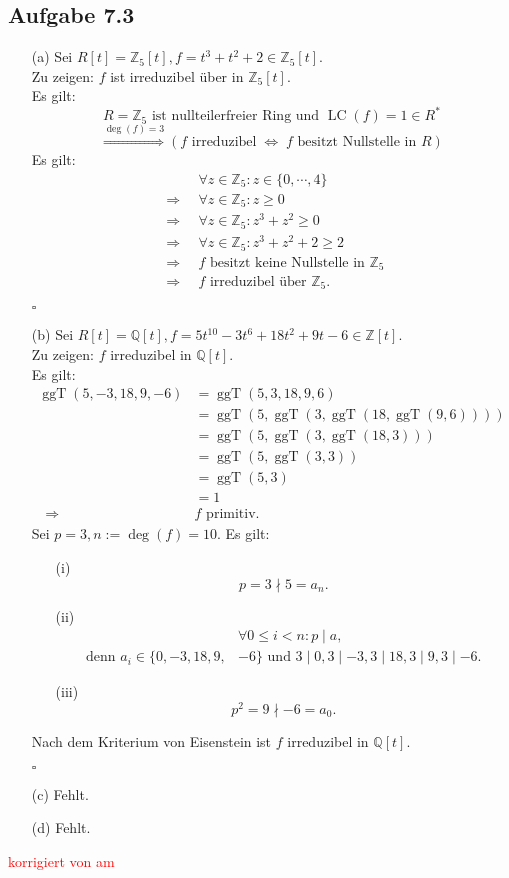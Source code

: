 \documentclass[12pt]{article}
\newcommand{\corr}[1]{\textcolor{red}{#1}}
\newcommand{\QED}{\begin{flushright} $\square$ \end{flushright}}
\newcommand{\df}{\enspace\Longrightarrow\enspace}
\newcommand{\gdw}{\;\Longleftrightarrow\;}
\newcommand{\ggT}{\operatorname{ggT}}
\newcommand{\grad}{\operatorname{deg}}
\newcommand{\LC}{\operatorname{LC}}
\begin{document}
\subsection*{Aufgabe 7.3}
\begin{enumerate}
	\item[(a)] Sei $R[t]=\mathbb{Z}_5[t], f=t^3+t^2+2\in\mathbb{Z}_5[t]$. \\
	Zu zeigen: $f$ ist irreduzibel über in $\mathbb{Z}_5[t]$. \\
	Es gilt: $$R=\mathbb{Z}_5\text{ ist nullteilerfreier Ring und }\LC(f)=1\in R^*$$
	$$\overset{\grad(f)=3}{\df} (f\text{ irreduzibel}\gdw f\text{ besitzt Nullstelle in }R)$$
	Es gilt:
	\begin{align*}
		&\forall z\in\mathbb{Z}_5:z\in\{0,\cdots,4\} \\
		\df &\forall z\in\mathbb{Z}_5:z\geq0 \\
		\df &\forall z\in\mathbb{Z}_5:z^3+z^2\geq0 \\
		\df &\forall z\in\mathbb{Z}_5:z^3+z^2+2\geq2 \\
		\df &f\text{ besitzt keine Nullstelle in }\mathbb{Z}_5 \\
		\df &f\text{ irreduzibel über }\mathbb{Z}_5.
	\end{align*}
	\QED
	
	\item[(b)] Sei $R[t]=\mathbb{Q}[t], f=5t^{10}-3t^6+18t^2+9t-6\in\mathbb{Z}[t]$. \\
	Zu zeigen: $f$ irreduzibel in $\mathbb{Q}[t]$. \\
	Es gilt:
	\begin{align*}
		\ggT(5,-3,18,9,-6)&=\ggT(5,3,18,9,6) \\
		&=\ggT(5,\ggT(3,\ggT(18,\ggT(9,6)))) \\
		&=\ggT(5,\ggT(3,\ggT(18,3))) \\
		&=\ggT(5,\ggT(3,3)) \\
		&=\ggT(5,3) \\
		&=1 \\
		\df &f\text{ primitiv}.
	\end{align*}
	Sei $p=3,n:=\grad(f)=10$. Es gilt:
	\begin{enumerate}
		\item[(i)] $$p=3\nmid5=a_n.$$
		
		\item[(ii)] 
		\begin{align*}
			&\forall0\leq i<n:p\mid a, \\
			\text{denn } a_i\in\{0,-3,18,9,&-6\}\text{ und }3\mid0,3\mid -3, 3\mid18,3\mid9,3\mid-6.
		\end{align*}
		
		\item[(iii)] $$p^2=9\nmid-6=a_0.$$
	\end{enumerate}
	Nach dem Kriterium von Eisenstein ist $f$ irreduzibel in $\mathbb{Q}[t]$.
	\QED
	
	\item[(c)] Fehlt.
	
	\item[(d)] Fehlt.
\end{enumerate}



\bigskip

\corr{korrigiert von \hspace{1cm} am }
\end{document}
